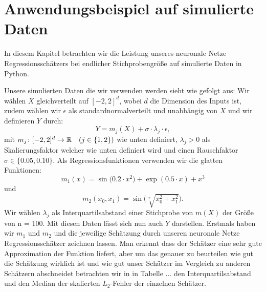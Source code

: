 \chapter{Anwendungsbeispiel auf simulierte Daten}
\label{chap:4}

In diesem Kapitel betrachten wir die Leistung unseres neuronale Netze Regressionsschätzers bei endlicher Stichprobengröße auf simulierte Daten in Python.

Unsere simulierten Daten die wir verwenden werden sieht wie gefolgt aus:
Wir wählen $X$ gleichverteilt auf $[-2, 2]^d$, wobei $d$ die Dimension des Inputs ist, zudem wählen wir $\epsilon$ als standardnormalverteilt und unabhängig von $X$ und wir definieren $Y$ durch:
$$Y = m_j(X) + \sigma \cdot \lambda_j \cdot \epsilon,$$ 
mit $m_j \colon [-2, 2]^d \to \mathbb{R} \quad (j \in \{1, 2\})$ wie unten definiert, $\lambda_j > 0$ als Skalierungsfaktor welcher wie unten definiert wird und einen Rauschfaktor $\sigma \in \{0.05, 0.10\}.$ Als Regressionsfunktionen verwenden wir die glatten Funktionen:
$$ m_1(x) =  \sin\big(0.2 \cdot x^2\big) + \exp(0.5 \cdot x) + x^3$$
und
$$ m_2(x_0, x_1) = \sin\big(\sqrt[2]{x_0^2 + x_1^2}\big).$$
Wir wählen $\lambda_j$ als Interquartilsabstand einer Stichprobe von $m(X)$ der Größe von n = 100. Mit diesen Daten lässt sich nun auch $Y$ darstellen.
Erstmals haben wir $m_1$ und $m_2$ und die jeweilige Schätzung durch unseren neuronale Netze Regressionsschätzer zeichnen lassen. Man erkennt dass der Schätzer eine sehr gute Approximation der Funktion liefert, aber um das genauer zu beurteilen wie gut die Schätzung wirklich ist und wie gut unser Schätzer im Vergleich zu anderen Schätzern abschneidet betrachten wir in in Tabelle ... den Interquartilsabstand und den Median der skalierten $L_2$-Fehler der einzelnen Schätzer. 

